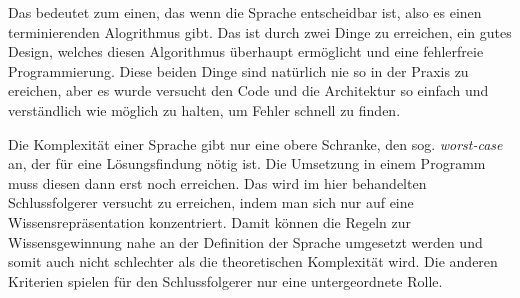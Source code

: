 Das bedeutet zum einen, das wenn die Sprache entscheidbar ist, also es einen terminierenden Alogrithmus gibt. Das ist durch zwei Dinge zu erreichen, ein gutes Design, welches diesen Algorithmus überhaupt ermöglicht und eine fehlerfreie Programmierung. Diese beiden Dinge sind natürlich nie so in der Praxis zu ereichen, aber es wurde versucht den Code und die Architektur so einfach und verständlich wie möglich zu halten, um Fehler schnell zu finden.

Die Komplexität einer Sprache gibt nur eine obere Schranke, den sog. \emph{worst-case} an, der für eine Lösungsfindung nötig ist. Die Umsetzung in einem Programm muss diesen dann erst noch erreichen. Das wird im hier behandelten Schlussfolgerer versucht zu erreichen, indem man sich nur auf eine Wissensrepräsentation konzentriert. Damit können die Regeln zur Wissensgewinnung nahe an der Definition der Sprache umgesetzt werden und somit auch nicht schlechter als die theoretischen Komplexität wird.
Die anderen Kriterien spielen für den Schlussfolgerer nur eine untergeordnete Rolle.



